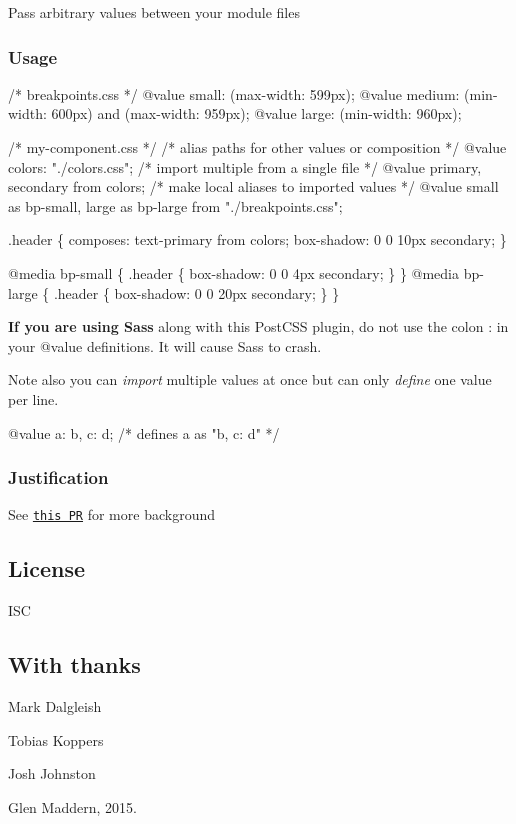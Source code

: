 Pass arbitrary values between your module files

\subsubsection*{Usage}





\begin{DoxyCode}
/* breakpoints.css */
@value small: (max-width: 599px);
@value medium: (min-width: 600px) and (max-width: 959px);
@value large: (min-width: 960px);
\end{DoxyCode}



\begin{DoxyCode}
/* my-component.css */
/* alias paths for other values or composition */
@value colors: "./colors.css"; 
/* import multiple from a single file */
@value primary, secondary from colors;
/* make local aliases to imported values */
@value small as bp-small, large as bp-large from "./breakpoints.css";

.header \{
  composes: text-primary from colors;
  box-shadow: 0 0 10px secondary;
\}

@media bp-small \{
  .header \{
    box-shadow: 0 0 4px secondary;
  \}
\}
@media bp-large \{
  .header \{
    box-shadow: 0 0 20px secondary;
  \}
\}
\end{DoxyCode}


{\bfseries If you are using Sass} along with this Post\+C\+SS plugin, do not use the colon {\ttfamily \+:} in your {\ttfamily @value} definitions. It will cause Sass to crash.

Note also you can {\itshape import} multiple values at once but can only {\itshape define} one value per line.


\begin{DoxyCode}
@value a: b, c: d; /* defines a as "b, c: d" */
\end{DoxyCode}


\subsubsection*{Justification}

See \href{https://github.com/css-modules/css-modules-loader-core/pull/28}{\tt this PR} for more background

\subsection*{License}

I\+SC

\subsection*{With thanks}


\begin{DoxyItemize}
\item Mark Dalgleish
\item Tobias Koppers
\item Josh Johnston 

 Glen Maddern, 2015. 
\end{DoxyItemize}